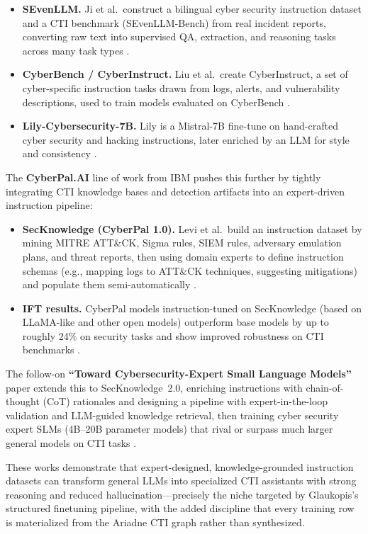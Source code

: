 \documentclass[unnumsec,webpdf,contemporary,large]{oup-authoring-template}
\theoremstyle{thmstyleone}
\theoremstyle{thmstyletwo}
\theoremstyle{thmstylethree}
\begin{document}
\begin{itemize}
  \item \textbf{SEvenLLM.} Ji et al.\ construct a bilingual cyber security instruction dataset and a CTI benchmark (SEvenLLM-Bench) from real incident reports, converting raw text into supervised QA, extraction, and reasoning tasks across many task types \cite{ji2024sevenllm}.
  \item \textbf{CyberBench / CyberInstruct.} Liu et al.\ create CyberInstruct, a set of cyber-specific instruction tasks drawn from logs, alerts, and vulnerability descriptions, used to train models evaluated on CyberBench \cite{liu2024cyberbench}.
  \item \textbf{Lily-Cybersecurity-7B.} Lily is a Mistral-7B fine-tune on hand-crafted cyber security and hacking instructions, later enriched by an LLM for style and consistency \cite{liu2024cyberbench}.
\end{itemize}

The \textbf{CyberPal.AI} line of work from IBM pushes this further by tightly integrating CTI knowledge bases and detection artifacts into an expert-driven instruction pipeline:

\begin{itemize}
  \item \textbf{SecKnowledge (CyberPal 1.0).} Levi et al.\ build an instruction dataset by mining MITRE ATT\&CK, Sigma rules, SIEM rules, adversary emulation plans, and threat reports, then using domain experts to define instruction schemas (e.g., mapping logs to ATT\&CK techniques, suggesting mitigations) and populate them semi-automatically \cite{levi2024cyberpal}.
  \item \textbf{IFT results.} CyberPal models instruction-tuned on SecKnowledge (based on LLaMA-like and other open models) outperform base models by up to roughly 24\% on security tasks and show improved robustness on CTI benchmarks \cite{levi2024cyberpal}.
\end{itemize}

The follow-on \textbf{``Toward Cybersecurity-Expert Small Language Models''} paper extends this to SecKnowledge~2.0, enriching instructions with chain-of-thought (CoT) rationales and designing a pipeline with expert-in-the-loop validation and LLM-guided knowledge retrieval, then training cyber security expert SLMs (4B--20B parameter models) that rival or surpass much larger general models on CTI tasks \cite{levi2025toward}.

These works demonstrate that expert-designed, knowledge-grounded instruction datasets can transform general LLMs into specialized CTI assistants with strong reasoning and reduced hallucination---precisely the niche targeted by Glaukopis's structured finetuning pipeline, with the added discipline that every training row is materialized from the Ariadne CTI graph rather than synthesized.
\end{document}
